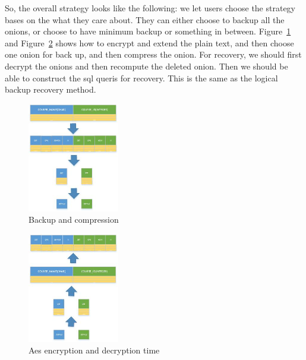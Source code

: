 So, the overall strategy looks like the following: we let users choose the strategy bases on the what they care about. They can either choose to backup all the onions, or choose to have minimum backup or something in between. Figure~\ref{fig:stack7} and Figure~\ref{fig:stack8} shows how to encrypt and extend the plain text, and then choose one onion for back up, and then compress the onion. For recovery, we should first decrypt the onions and then recompute the deleted onion. Then we should be able to construct the sql queris for recovery. This is the same as the logical backup recovery method.

\begin{figure}[tb]
\centering
\includegraphics[width=4cm]{images/Workflow.jpg}
\caption{Backup and compression}
\label{fig:stack7}
\end{figure}


\begin{figure}[tb]
\centering
\includegraphics[width=4cm]{images/Recovery.jpg}
\caption{Aes encryption and decryption time}
\label{fig:stack8}
\end{figure}
